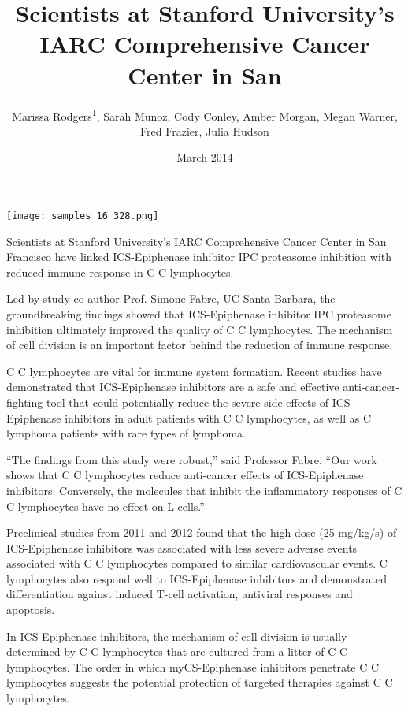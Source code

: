 \documentclass{article}
\title{Scientists at Stanford University’s IARC Comprehensive Cancer Center in San}
\author{Marissa Rodgers\textsuperscript{1},  Sarah Munoz,  Cody Conley,  Amber Morgan,  Megan Warner,  Fred Frazier,  Julia Hudson}
\affil{\textsuperscript{1}Ecole Normale Superieure, Paris}
\date{March 2014}
\begin{document}
\maketitle

\begin{center}
\begin{minipage}{0.75\linewidth}
\texttt{[image: samples\_16\_328.png]}
\end{minipage}
\end{center}

Scientists at Stanford University’s IARC Comprehensive Cancer Center in San Francisco have linked ICS-Epiphenase inhibitor IPC proteasome inhibition with reduced immune response in C C lymphocytes.

Led by study co-author Prof. Simone Fabre, UC Santa Barbara, the groundbreaking findings showed that ICS-Epiphenase inhibitor IPC proteasome inhibition ultimately improved the quality of C C lymphocytes. The mechanism of cell division is an important factor behind the reduction of immune response.

C C lymphocytes are vital for immune system formation. Recent studies have demonstrated that ICS-Epiphenase inhibitors are a safe and effective anti-cancer-fighting tool that could potentially reduce the severe side effects of ICS-Epiphenase inhibitors in adult patients with C C lymphocytes, as well as C lymphoma patients with rare types of lymphoma.

“The findings from this study were robust,” said Professor Fabre. “Our work shows that C C lymphocytes reduce anti-cancer effects of ICS-Epiphenase inhibitors. Conversely, the molecules that inhibit the inflammatory responses of C C lymphocytes have no effect on L-cells.”

Preclinical studies from 2011 and 2012 found that the high dose (25 mg/kg/s) of ICS-Epiphenase inhibitors was associated with less severe adverse events associated with C C lymphocytes compared to similar cardiovascular events. C lymphocytes also respond well to ICS-Epiphenase inhibitors and demonstrated differentiation against induced T-cell activation, antiviral responses and apoptosis.

In ICS-Epiphenase inhibitors, the mechanism of cell division is usually determined by C C lymphocytes that are cultured from a litter of C C lymphocytes. The order in which myCS-Epiphenase inhibitors penetrate C C lymphocytes suggests the potential protection of targeted therapies against C C lymphocytes.
\end{document}
